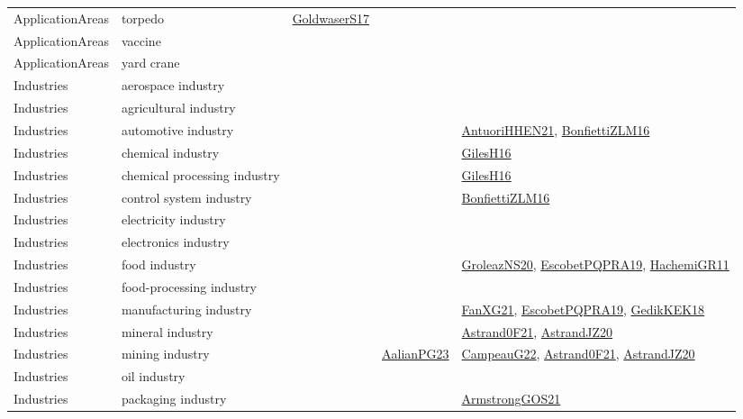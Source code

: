{\begin{longtable}{lp{3cm}>{\raggedright}p{6cm}>{\raggedright}p{6cm}p{8cm}}
ApplicationAreas & torpedo & \href{papers/GoldwaserS17.pdf}{GoldwaserS17}\cite{GoldwaserS17} &  & \\
ApplicationAreas & vaccine &  &  & \\
ApplicationAreas & yard crane &  &  & \\
Industries & aerospace industry &  &  & \\
Industries & agricultural industry &  &  & \\
Industries & automotive industry &  &  & \href{papers/AntuoriHHEN21.pdf}{AntuoriHHEN21}\cite{AntuoriHHEN21}, \href{papers/BonfiettiZLM16.pdf}{BonfiettiZLM16}\cite{BonfiettiZLM16}\\
Industries & chemical industry &  &  & \href{papers/GilesH16.pdf}{GilesH16}\cite{GilesH16}\\
Industries & chemical processing industry &  &  & \href{papers/GilesH16.pdf}{GilesH16}\cite{GilesH16}\\
Industries & control system industry &  &  & \href{papers/BonfiettiZLM16.pdf}{BonfiettiZLM16}\cite{BonfiettiZLM16}\\
Industries & electricity industry &  &  & \\
Industries & electronics industry &  &  & \\
Industries & food industry &  &  & \href{papers/GroleazNS20.pdf}{GroleazNS20}\cite{GroleazNS20}, \href{articles/EscobetPQPRA19.pdf}{EscobetPQPRA19}\cite{EscobetPQPRA19}, \href{articles/HachemiGR11.pdf}{HachemiGR11}\cite{HachemiGR11}\\
Industries & food-processing industry &  &  & \\
Industries & manufacturing industry &  &  & \href{articles/FanXG21.pdf}{FanXG21}\cite{FanXG21}, \href{articles/EscobetPQPRA19.pdf}{EscobetPQPRA19}\cite{EscobetPQPRA19}, \href{articles/GedikKEK18.pdf}{GedikKEK18}\cite{GedikKEK18}\\
Industries & mineral industry &  &  & \href{papers/Astrand0F21.pdf}{Astrand0F21}\cite{Astrand0F21}, \href{articles/AstrandJZ20.pdf}{AstrandJZ20}\cite{AstrandJZ20}\\
Industries & mining industry &  & \href{papers/AalianPG23.pdf}{AalianPG23}\cite{AalianPG23} & \href{articles/CampeauG22.pdf}{CampeauG22}\cite{CampeauG22}, \href{papers/Astrand0F21.pdf}{Astrand0F21}\cite{Astrand0F21}, \href{articles/AstrandJZ20.pdf}{AstrandJZ20}\cite{AstrandJZ20}\\
Industries & oil industry &  &  & \\
Industries & packaging industry &  &  & \href{papers/ArmstrongGOS21.pdf}{ArmstrongGOS21}\cite{ArmstrongGOS21}\\

\end{longtable}}
